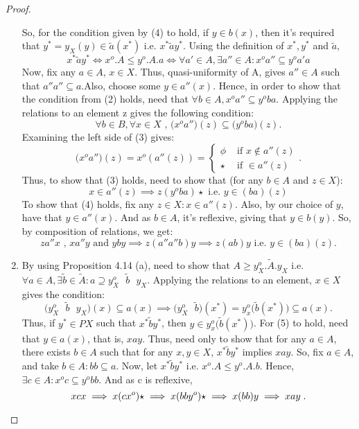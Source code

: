 \documentclass[a4paper]{article}
\theoremstyle{definition}
\begin{document}
\begin{proof}
\begin{enumerate}[label=(\alph*)]
		So, for the condition given by (4) to hold, if $y \in b(x)$, then it's required that
		$y^*=y_X(y) \in \tilde{a} (x^*)$ i.e. $x^* \tilde{a}y^*$. Using the definition of $x^*,y^*$
		and $\tilde{a}$,
		\begin{equation} x^* \tilde{a}y^* \iff x^o.A\leq y^o.A.a \iff
		\forall a' \in A, \exists a'' \in A: x^oa'' \subseteq y^oa'a  \end{equation}
		Now, fix any $a \in A$, $x\in X$. Thus, quasi-uniformity of A, gives $a'' \in A$ such that
		$a''a''\subseteq a$.Also, choose some $y \in a''(x)$. Hence, in
		order to show that the condition from (2) holds, need that
		$\forall b \in A, x^o a'' \subseteq y^oba$. Applying the relations to an element z
		gives the following condition:
		\begin{equation} \forall b \in B, \forall x \in X \text{ , }
		\big(x^oa''\big)(z) \subseteq \big(y^oba\big)(z). \end{equation}
		Examining the left side of (3) gives:
		\[ \big( x^oa''\big)(z)=x^o (a''(z))= \begin{cases}
			\phi &\text{ if } x \notin a''(z) \\
			\star & \text{ if } \in a''(z)
		\end{cases} .\]
		Thus, to show that (3) holds, need to show that (for any $b\in A$ and $z \in X$):
		\begin{equation} x \in a''(z) \implies z(y^oba)\star \text{ i.e. } y\in(ba)(z)
		\end{equation}
		To show that (4) holds, fix any $z\in X: x \in a''(z)$. Also, by our choice of $y$,
		have that $y \in a''(x)$. And as $b\in A$, it's reflexive, giving that $y \in b(y)$.
		So, by composition of relations, we get:
		\[ za''x \text{ , }  xa''y \text{ and } yby \implies z(a''a''b)y \implies z(ab)y \text{ i.e. }
		y \in (ba)(z).\]
	\item By using Proposition 4.14 (a), need to show that $A\geq y_X^o.\tilde{A}.y_X$ i.e. $\forall
		a\in A, \exists \tilde{b}\in \tilde{A} :  a \supseteq y_X^o \text{ } \tilde{b} \text{ } y_X $.
		Applying the relations to an element, $x\in X$ gives the condition:
		\begin{equation}
			\Big( y_X^o \text{ } \tilde{b} \text{ } y_X \Big)(x) \subseteq a(x)
			\implies \Big( y_X^o \text{ } \tilde{b} \Big) (x^*)= y_x^o
			\Big(\tilde{b}(x^*)\Big) \subseteq a(x).
		\end{equation}
		Thus, if $y^* \in PX$ such that $x^* \tilde{b} y^*$, then
		$y \in y_x^o\Big(\tilde{b}(x^*)\Big)$. For (5) to hold, need that
		$y \in a(x)$, that is, $xay$. Thus,
		need only to show that for any $a\in A$, there exists $b\in A $ such that
		for any $x,y \in X$, $x^* \tilde{b}y^*$ implies $xay$.
		So, fix $a\in A$, and take $b \in A: bb \subseteq a$.
		Now, let $x^* \tilde{b}y^*$ i.e. $x^o.A \leq y^o .A .b$.
		Hence, $\exists c \in A: x^oc \subseteq y^o bb$. And as c is reflexive,
		\[ xcx \implies x(cx^o)\star \implies x(bby^o)\star \implies x(bb)y \implies xay\;. \qedhere \]
\end{enumerate}
\end{proof}
\end{document}
